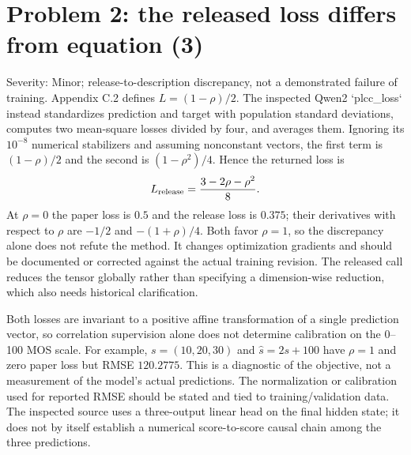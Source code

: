 \documentclass[10pt]{article}
\begin{document}
\section*{Problem 2: the released loss differs from equation (3)}
Severity: Minor; release-to-description discrepancy, not a demonstrated failure of training. Appendix C.2 defines \(L=(1-\rho)/2\). The inspected Qwen2 `plcc\_loss` instead standardizes prediction and target with population standard deviations, computes two mean-square losses divided by four, and averages them. Ignoring its \(10^{-8}\) numerical stabilizers and assuming nonconstant vectors, the first term is \((1-\rho)/2\) and the second is \((1-\rho^2)/4\). Hence the returned loss is \[L_{\rm release}=\frac{3-2\rho-\rho^2}{8}.\] At \(\rho=0\) the paper loss is \(0.5\) and the release loss is \(0.375\); their derivatives with respect to \(\rho\) are \(-1/2\) and \(-(1+\rho)/4\). Both favor \(\rho=1\), so the discrepancy alone does not refute the method. It changes optimization gradients and should be documented or corrected against the actual training revision. The released call reduces the tensor globally rather than specifying a dimension-wise reduction, which also needs historical clarification.\par
Both losses are invariant to a positive affine transformation of a single prediction vector, so correlation supervision alone does not determine calibration on the 0–100 MOS scale. For example, \(s=(10,20,30)\) and \(\hat s=2s+100\) have \(\rho=1\) and zero paper loss but RMSE \(120.2775\). This is a diagnostic of the objective, not a measurement of the model’s actual predictions. The normalization or calibration used for reported RMSE should be stated and tied to training/validation data. The inspected source uses a three-output linear head on the final hidden state; it does not by itself establish a numerical score-to-score causal chain among the three predictions.\par
\end{document}
